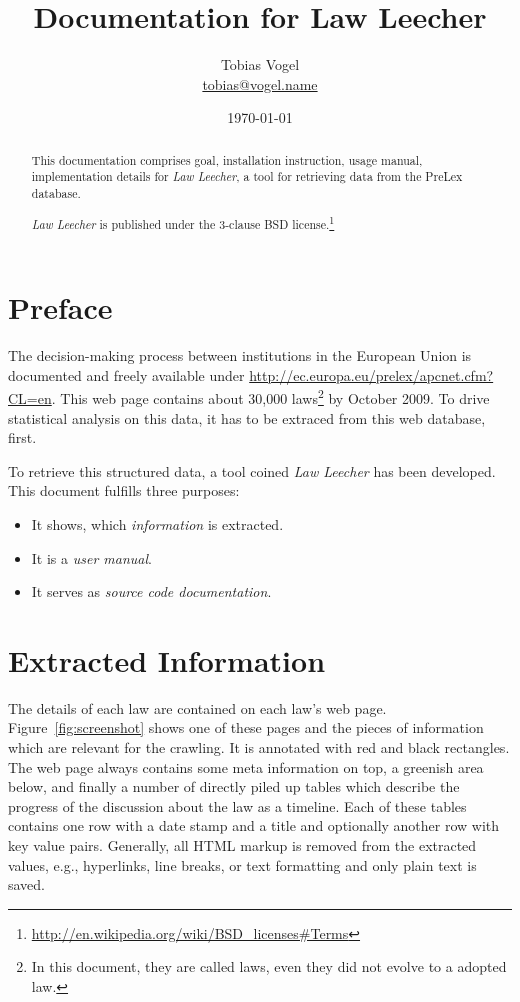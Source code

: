 \documentclass{scrartcl}
\title{Documentation for Law Leecher}
\author{Tobias Vogel\\\url{tobias@vogel.name}}
\date{\today}
\begin{document}
\maketitle

\begin{abstract}
This documentation comprises goal, installation instruction, usage manual, implementation details for \textit{Law Leecher}, a tool for retrieving data from the PreLex database.

\textit{Law Leecher} is published under the 3-clause BSD license.\footnote{\url{http://en.wikipedia.org/wiki/BSD_licenses#Terms}}
\end{abstract}


\tableofcontents


\section{Preface}
The decision-making process between institutions in the European Union is documented and freely available under \url{http://ec.europa.eu/prelex/apcnet.cfm?CL=en}. This web page contains about 30,000 laws\footnote{In this document, they are called laws, even they did not evolve to a adopted law.} by October 2009. To drive statistical analysis on this data, it has to be extraced from this web database, first.

To retrieve this structured data, a tool coined \textit{Law Leecher} has been developed. This document fulfills three purposes:

\begin{itemize}
\item It shows, which \textit{information} is extracted.
\item It is a \textit{user manual}.
\item It serves as \textit{source code documentation}.
\end{itemize}



\section{Extracted Information}
The details of each law are contained on each law's web page. Figure~\ref{fig:screenshot} shows one of these pages and the pieces of information which are relevant for the crawling. It is annotated with red and black rectangles. The web page always contains some meta information on top, a greenish area below, and finally a number of directly piled up tables which describe the progress of the discussion about the law as a timeline. Each of these tables contains one row with a date stamp and a title and optionally another row with key value pairs. Generally, all HTML markup is removed from the extracted values, e.g., hyperlinks, line breaks, or text formatting and only plain text is saved.
\end{document}
